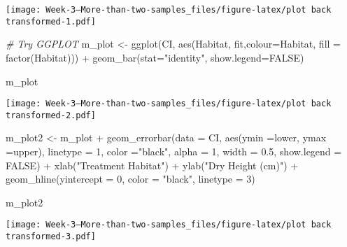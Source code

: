 \documentclass[
]{article}
\newenvironment{Shaded}{\begin{snugshade}}{\end{snugshade}}
\newcommand{\AttributeTok}[1]{\textcolor[rgb]{0.77,0.63,0.00}{#1}}
\newcommand{\CommentTok}[1]{\textcolor[rgb]{0.56,0.35,0.01}{\textit{#1}}}
\newcommand{\ConstantTok}[1]{\textcolor[rgb]{0.00,0.00,0.00}{#1}}
\newcommand{\DecValTok}[1]{\textcolor[rgb]{0.00,0.00,0.81}{#1}}
\newcommand{\FloatTok}[1]{\textcolor[rgb]{0.00,0.00,0.81}{#1}}
\newcommand{\FunctionTok}[1]{\textcolor[rgb]{0.00,0.00,0.00}{#1}}
\newcommand{\NormalTok}[1]{#1}
\newcommand{\OtherTok}[1]{\textcolor[rgb]{0.56,0.35,0.01}{#1}}
\newcommand{\SpecialCharTok}[1]{\textcolor[rgb]{0.00,0.00,0.00}{#1}}
\newcommand{\StringTok}[1]{\textcolor[rgb]{0.31,0.60,0.02}{#1}}
\begin{document}
\texttt{[image: Week-3---More-than-two-samples\_files/figure-latex/plot back transformed-1.pdf]}

\begin{Shaded}
\begin{Highlighting}[]
\CommentTok{\# Try GGPLOT}
\NormalTok{m\_plot }\OtherTok{\textless{}{-}} \FunctionTok{ggplot}\NormalTok{(CI, }\FunctionTok{aes}\NormalTok{(Habitat, fit,}\AttributeTok{colour=}\NormalTok{Habitat,}
\AttributeTok{fill =} \FunctionTok{factor}\NormalTok{(Habitat))) }\SpecialCharTok{+} \FunctionTok{geom\_bar}\NormalTok{(}\AttributeTok{stat=}\StringTok{"identity"}\NormalTok{,}
\AttributeTok{show.legend=}\ConstantTok{FALSE}\NormalTok{)}

\NormalTok{m\_plot}
\end{Highlighting}
\end{Shaded}

\texttt{[image: Week-3---More-than-two-samples\_files/figure-latex/plot back transformed-2.pdf]}

\begin{Shaded}
\begin{Highlighting}[]
\NormalTok{m\_plot2 }\OtherTok{\textless{}{-}}\NormalTok{ m\_plot }\SpecialCharTok{+} \FunctionTok{geom\_errorbar}\NormalTok{(}\AttributeTok{data =}\NormalTok{ CI, }\FunctionTok{aes}\NormalTok{(}\AttributeTok{ymin =}\NormalTok{lower, }\AttributeTok{ymax =}\NormalTok{upper), }\AttributeTok{linetype =} \DecValTok{1}\NormalTok{, }\AttributeTok{color =}\StringTok{"black"}\NormalTok{,}
                                  \AttributeTok{alpha =} \DecValTok{1}\NormalTok{, }\AttributeTok{width =} \FloatTok{0.5}\NormalTok{, }\AttributeTok{show.legend =} \ConstantTok{FALSE}\NormalTok{) }\SpecialCharTok{+}
\FunctionTok{xlab}\NormalTok{(}\StringTok{"Treatment Habitat"}\NormalTok{) }\SpecialCharTok{+} \FunctionTok{ylab}\NormalTok{(}\StringTok{"Dry Height (cm)"}\NormalTok{) }\SpecialCharTok{+} 
  \FunctionTok{geom\_hline}\NormalTok{(}\AttributeTok{yintercept =} \DecValTok{0}\NormalTok{, }\AttributeTok{color =} \StringTok{"black"}\NormalTok{, }\AttributeTok{linetype =} \DecValTok{3}\NormalTok{)}

\NormalTok{m\_plot2}
\end{Highlighting}
\end{Shaded}

\texttt{[image: Week-3---More-than-two-samples\_files/figure-latex/plot back transformed-3.pdf]}
\end{document}
